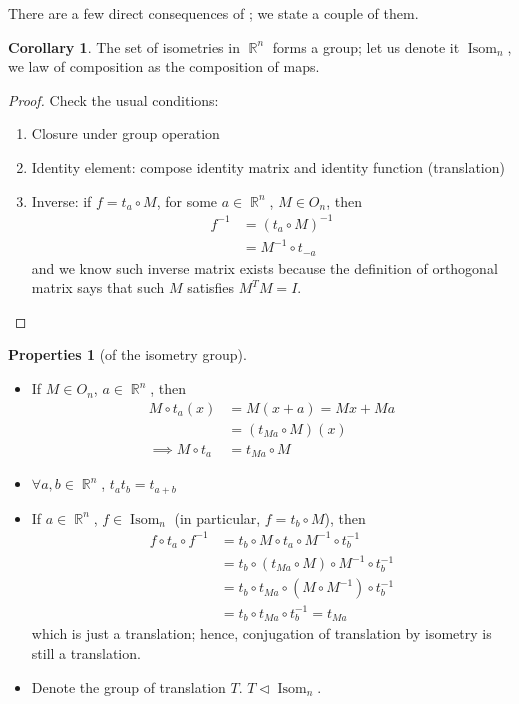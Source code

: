 \documentclass[11pt]{amsart} %
\theoremstyle{definition}
\newtheorem{corollary}[definition]{Corollary}
\newtheorem{properties}[definition]{Properties}
\theoremstyle{definition}
\DeclareMathOperator{\R}{\mathbb{R}}
\DeclareMathOperator{\isom}{Isom}
\numberwithin{equation}{section}
\begin{document}
There are a few direct consequences of ; we state a couple of them.

\begin{corollary}
	The set of isometries in $\R^n$ forms a group; let us denote it $\isom_n$, we law of composition as the composition of maps.
\end{corollary}

\begin{proof}
	Check the usual conditions:
	\begin{enumerate}%
		\item Closure under group operation
		\item Identity element: compose identity matrix and identity function (translation)
		\item Inverse: if $f = t_a \circ M$, for some $a \in \R^n$, $M \in O_n$, then
		\begin{align*}
		f^{-1} &= (t_a \circ M)^{-1} \\
		&= M^{-1} \circ t_{-a}
		\end{align*}
		and we know such inverse matrix exists because the definition of orthogonal matrix says that such $M$ satisfies $M^T M = I$.
	\end{enumerate}
\end{proof}

\begin{properties}[of the isometry group]
	\begin{itemize}%
		\item If $M \in O_n$, $a \in \R^n$, then
		\begin{align*}
			M \circ t_a (x) &= M(x+a) = Mx+Ma \\
			&= (t_{Ma} \circ M) (x) \\
			\implies M \circ t_a &= t_{Ma} \circ M
		\end{align*}
		
		\item $\forall a,b \in \R^n$, $t_a t_b = t_{a+b}$

		\item If $a \in \R^n$, $f \in \isom_n$ (in particular, $f = t_b \circ M$), then
		\begin{align*}
			f \circ t_a  \circ f^{-1} &= t_b \circ M \circ t_a \circ M^{-1} \circ t_b^{-1} \\
			&= t_b  \circ (t_{Ma} \circ M) \circ M^{-1} \circ t_b^{-1} \\
			&= t_b  \circ t_{Ma} \circ (M \circ M^{-1}) \circ t_b^{-1} 	\\
			&= t_b  \circ t_{Ma} \circ t_b^{-1} = t_{Ma}
		\end{align*}
		which is just a translation; hence, conjugation of translation by isometry is still a translation.

		\item Denote the group of translation $T$. $T \lhd \isom_n$.
	\end{itemize}
\end{properties}
\end{document}
